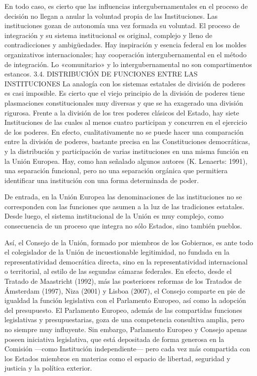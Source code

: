 \documentclass[10pt,a4paper]{article}
\begin{document}
En todo caso, es cierto que las influencias intergubernamentales
en el proceso de decisión no llegan a anular la voluntad propia de
las Instituciones. Las instituciones gozan de autonomía una vez
formada su voluntad.
El proceso de integración y su sistema institucional es original,
complejo y lleno de contradicciones y ambigüedades. Hay
inspiración y esencia federal en los moldes organizativos
internacionales; hay cooperación intergubernamental en el método
de integración. Lo «comunitario» y lo intergubernamental no son
compartimentos estancos.
3.4. DISTRIBUCIÓN DE FUNCIONES ENTRE LAS INSTITUCIONES
La analogía con los sistemas estatales de división de poderes es casi imposible. Es cierto que el viejo principio de la división de poderes tiene plasmaciones constitucionales muy diversas y que se ha exagerado una división rigurosa. Frente a la división de los tres poderes clásicos del Estado, hay siete Instituciones de las cuales al menos cuatro participan y concurren en el ejercicio de los poderes. En efecto, cualitativamente no se puede hacer una comparación entre la división de poderes, bastante precisa en las Constituciones democráticas, y la distribución y participación de varias instituciones en una misma función en la Unión Europea. Hay, como han señalado algunos autores (K. Lenaerts: 1991), una separación funcional, pero no una separación orgánica que permitiera identificar una institución con una forma determinada de poder.

De entrada, en la Unión Europea las denominaciones de las instituciones no se corresponden con las funciones que asumen a la luz de las tradiciones estatales. Desde luego, el sistema institucional de la Unión es muy complejo, como consecuencia de un proceso que integra no sólo Estados, sino también pueblos. 

Así, el Consejo de la Unión, formado por miembros de los Gobiernos, es ante todo el colegislador de la Unión de incuestionable legitimidad, no fundada en la representatividad democrática directa, sino en la representatividad internacional o territorial, al estilo de las segundas cámaras federales. En efecto, desde el Tratado de Maastricht (1992), más las posteriores reformas de los Tratados de Ámsterdam (1997), Niza (2001) y Lisboa (2007), el Consejo comparte en pie de igualdad la función legislativa con el Parlamento Europeo, así como la adopción del presupuesto. El Parlamento Europeo, además de las compartidas funciones legislativas y presupuestarias, goza de una competencia consultiva amplia, pero no siempre muy influyente. Sin embargo, Parlamento Europeo y Consejo apenas poseen iniciativa legislativa, que está depositada de forma generosa en la Comisión —como Institución independiente— pero cada vez más compartida con los Estados miembros en materias como el espacio de libertad, seguridad y justicia y la política exterior.
\end{document}
